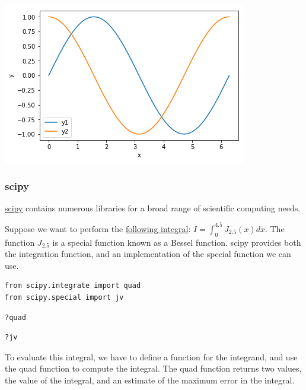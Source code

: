 \documentclass[11pt]{article}
\begin{document}
\begin{center}
\includegraphics[width=.9\linewidth]{obipy-resources/6316de97116077f6ddc28b130cb204f8-49561f3P.png}
\end{center}

\subsubsection{scipy}
\label{sec:org1cfcf7a}

\href{https://www.scipy.org}{scipy} contains numerous libraries for a broad range of scientific computing needs.

Suppose we want to perform the \href{https://docs.scipy.org/doc/scipy/reference/tutorial/integrate.html\#general-integration-quad}{following integral}: \(I = \int_0^{4.5} J_{2.5}(x) dx\). The function \(J_{2.5}\) is a special function known as a Bessel function. scipy provides both the integration function, and an implementation of the special function we can use.

\begin{verbatim}
from scipy.integrate import quad
from scipy.special import jv
\end{verbatim}

\begin{verbatim}
?quad
\end{verbatim}

\begin{verbatim}
?jv
\end{verbatim}

To evaluate this integral, we have to define a function for the integrand, and use the quad function to compute the integral. The quad function returns two values, the value of the integral, and an estimate of the maximum error in the integral.
\end{document}
